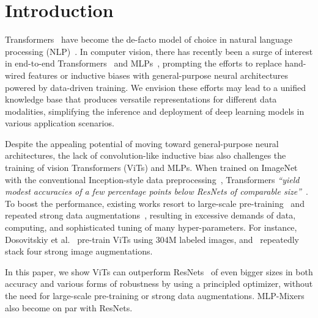 \documentclass{article}
\begin{document}
\begin{abstract}

\end{abstract}


\section{Introduction}
Transformers~\cite{vaswani2017attention} have become the de-facto model of choice in natural language processing (NLP)~\cite{devlin2018bert,gpt}. In computer vision,
there has recently been a surge of interest in end-to-end Transformers~\cite{dosovitskiy2021an,touvron2021training,liu2021swin,fan2021multiscale,arnab2021vivit,bertasius2021space,akbari2021vatt} and MLPs~\cite{tolstikhin2021mlpmixer,touvron2021resmlp,liu2021pay,melas2021you}, prompting the efforts to replace hand-wired features or inductive biases with  general-purpose neural architectures powered by data-driven training. We envision these efforts may lead to a unified knowledge base that produces versatile representations for different data modalities, simplifying the inference and deployment of deep learning models in various application scenarios. 

Despite the appealing potential of moving toward general-purpose neural architectures, the lack of convolution-like inductive bias also challenges the training of vision Transformers (ViTs) and MLPs. When trained on ImageNet~\cite{deng2009imagenet} with the conventional Inception-style data preprocessing~\cite{szegedy2016inception}, Transformers \textit{``yield modest accuracies of a few percentage points below ResNets of comparable size''}~\cite{dosovitskiy2021an}. To boost the performance, existing works resort to large-scale pre-training~\cite{dosovitskiy2021an,arnab2021vivit,akbari2021vatt} and repeated strong data augmentations~\cite{touvron2021training}, resulting in excessive demands of data, computing, and sophisticated tuning of many hyper-parameters. For instance, Dosovitskiy et al.~\cite{dosovitskiy2021an} pre-train ViTs using 304M labeled images, and~\citet{touvron2021training} repeatedly stack four strong image augmentations.

In this paper, we show ViTs can outperform ResNets~\cite{he2016resnet} of even bigger sizes in both accuracy and various forms of robustness by using a principled optimizer, without the need for large-scale pre-training or strong data augmentations. MLP-Mixers~\cite{tolstikhin2021mlpmixer} also become on par with ResNets.
\end{document}
